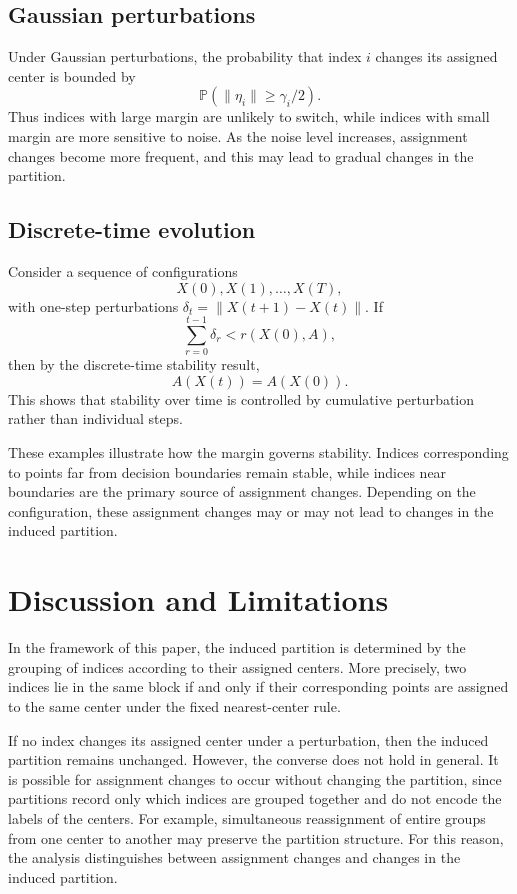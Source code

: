\documentclass[11pt]{amsart}
\theoremstyle{plain}
\theoremstyle{definition}
\begin{document}
\subsection{Gaussian perturbations}

Under Gaussian perturbations, the probability that index $i$ changes its assigned center is bounded by
\[
\mathbb{P}(\|\eta_i\| \ge \gamma_i/2).
\]
Thus indices with large margin are unlikely to switch, while indices with small margin are more sensitive to noise. As the noise level increases, assignment changes become more frequent, and this may lead to gradual changes in the partition.

\subsection{Discrete-time evolution}

Consider a sequence of configurations
\[
X(0), X(1), \ldots, X(T),
\]
with one-step perturbations $\delta_t = \|X(t+1) - X(t)\|$. If
\[
\sum_{r=0}^{t-1} \delta_r < r(X(0),A),
\]
then by the discrete-time stability result,
\[
A(X(t)) = A(X(0)).
\]
This shows that stability over time is controlled by cumulative perturbation rather than individual steps.

These examples illustrate how the margin governs stability. Indices corresponding to points far from decision boundaries remain stable, while indices near boundaries are the primary source of assignment changes. Depending on the configuration, these assignment changes may or may not lead to changes in the induced partition.





\section{Discussion and Limitations}

In the framework of this paper, the induced partition is determined by the grouping of indices according to their assigned centers. More precisely, two indices lie in the same block if and only if their corresponding points are assigned to the same center under the fixed nearest-center rule.

If no index changes its assigned center under a perturbation, then the induced partition remains unchanged. However, the converse does not hold in general. It is possible for assignment changes to occur without changing the partition, since partitions record only which indices are grouped together and do not encode the labels of the centers. For example, simultaneous reassignment of entire groups from one center to another may preserve the partition structure. For this reason, the analysis distinguishes between assignment changes and changes in the induced partition.
\end{document}
